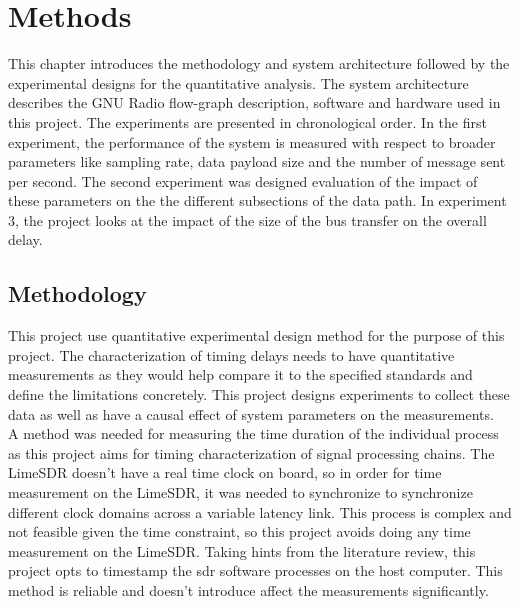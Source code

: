 \chapter{Methods}
This chapter introduces the methodology and system architecture followed by the experimental designs for the quantitative analysis.
The system architecture describes the GNU Radio flow-graph description, software and hardware used in this project. The experiments are presented in chronological order. In the first experiment, the performance of the system is measured with respect to broader parameters like sampling rate, data payload size and the number of message sent per second. The second experiment was designed evaluation of the impact of these parameters on the the different subsections of the data path. In experiment 3, the project looks at the impact of the size of the bus transfer on the overall delay.

\section{Methodology}
This project use quantitative experimental design method for the purpose of this project.
The characterization of timing delays needs to have quantitative measurements as they would help compare it to the specified standards and define the limitations concretely.
This project designs experiments to collect these data as well as have a causal effect of system parameters on the measurements.\\

A method was needed for measuring the time duration of the individual process as this project aims for timing characterization of signal processing chains.
The LimeSDR doesn't have a real time clock on board, so in order for time measurement on the LimeSDR, it was needed to synchronize to synchronize different clock domains across a variable latency link.
This process is complex and not feasible given the time constraint, so this project avoids doing any time measurement on the LimeSDR.
Taking hints from the literature review, this project opts to timestamp the \ac{sdr} software processes on the host computer.
This method is reliable and doesn't introduce affect the measurements significantly.\\

